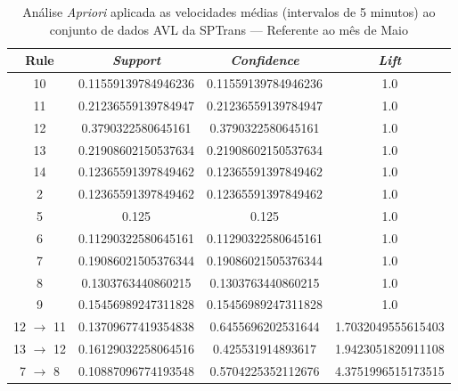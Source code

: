 \documentclass[
	12pt,				%
	oneside,			%
	a4paper,			%
	english,			%
	brazil				%
	]{abntex2ppgsi}
\begin{document}
\begin{apendicesenv}
\begin{table}[!htb]
\centering
\caption {Análise \textit{Apriori} aplicada as velocidades médias (intervalos de 5 minutos) ao conjunto de dados AVL da SPTrans --- Referente ao mês de Maio}
\label {tab:aprioriMay}
\begin{tabular}{c|c|c|c}
\hline
\textbf{Rule} & \textit{\textbf{Support}} & \textit{\textbf{Confidence}} & \textit{\textbf{Lift}} \\
\hline
10 &  0.11559139784946236 &  0.11559139784946236 &  1.0\\
\hline
11 &  0.21236559139784947 &  0.21236559139784947 &  1.0\\
\hline
12 &  0.3790322580645161 &  0.3790322580645161 &  1.0\\
\hline
13 &  0.21908602150537634 &  0.21908602150537634 &  1.0\\
\hline
14 &  0.12365591397849462 &  0.12365591397849462 &  1.0\\
\hline
2 &  0.12365591397849462 &  0.12365591397849462 &  1.0\\
\hline
5 &  0.125 &  0.125 &  1.0\\
\hline
6 &  0.11290322580645161 &  0.11290322580645161 &  1.0\\
\hline
7 &  0.19086021505376344 &  0.19086021505376344 &  1.0\\
\hline
8 &  0.1303763440860215 &  0.1303763440860215 &  1.0\\
\hline
9 &  0.15456989247311828 &  0.15456989247311828 &  1.0\\
\hline
12 $\rightarrow$ 11 &  0.13709677419354838 &  0.6455696202531644 &  1.7032049555615403\\
\hline
13 $\rightarrow$ 12 &  0.16129032258064516 &  0.425531914893617 &  1.9423051820911108\\
\hline
7 $\rightarrow$ 8 &  0.10887096774193548 &  0.5704225352112676 &  4.3751996515173515\\
\hline
\end{tabular}
\end{table}


\end{apendicesenv}
\end{document}
